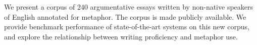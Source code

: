 We present a corpus of 240 argumentative essays written by non-native speakers of English annotated for metaphor. The corpus is  made publicly available. We provide benchmark performance of state-of-the-art systems on this new corpus, and explore the relationship between writing proficiency and metaphor use.
